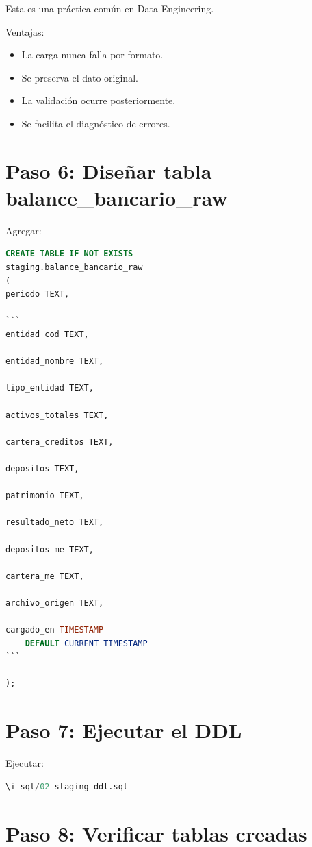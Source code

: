 Esta es una práctica común en Data Engineering.

Ventajas:

\begin{itemize}
\item La carga nunca falla por formato.
\item Se preserva el dato original.
\item La validación ocurre posteriormente.
\item Se facilita el diagnóstico de errores.
\end{itemize}

\section{Paso 6: Diseñar tabla balance\_bancario\_raw}

Agregar:

\begin{lstlisting}[language=SQL]
CREATE TABLE IF NOT EXISTS
staging.balance_bancario_raw
(
periodo TEXT,

```
entidad_cod TEXT,

entidad_nombre TEXT,

tipo_entidad TEXT,

activos_totales TEXT,

cartera_creditos TEXT,

depositos TEXT,

patrimonio TEXT,

resultado_neto TEXT,

depositos_me TEXT,

cartera_me TEXT,

archivo_origen TEXT,

cargado_en TIMESTAMP
    DEFAULT CURRENT_TIMESTAMP
```

);
\end{lstlisting}

\section{Paso 7: Ejecutar el DDL}

Ejecutar:

\begin{lstlisting}[language=SQL]
\i sql/02_staging_ddl.sql
\end{lstlisting}

\section{Paso 8: Verificar tablas creadas}


